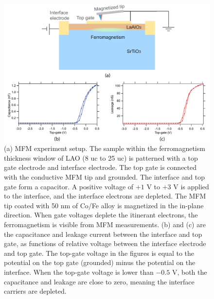 \documentclass[pdflatex, sectionletters, 12pt]{pittetd}    %
\begin{document}
\begin{figure}[p]
	\centering
	\includegraphics[width=1.0\textwidth]{Drawing/LAOSTOMFM.pdf}
	\caption{(a) MFM experiment setup. The sample within the ferromagnetism thickness window of LAO (8 uc to 25 uc) is patterned with a top gate electrode and interface electrode. The top gate is connected with the conductive MFM tip and grounded. The interface and top gate form a capacitor. A positive voltage of $+1$ V to $+3$ V is applied to the interface, and the interface electrons are depleted. The MFM tip coated with 50 nm of Co/Fe alloy is magnetized in the in-plane direction. When gate voltages deplete the itinerant electrons, the ferromagnetism is visible from MFM measurements. (b) and (c) are the capacitance and leakage current between the interface and top gate, as functions of relative voltage between the interface electrode and top gate. The top-gate voltage in the figures is equal to the potential on the top gate (grounded) minus the potential on the interface. When the top-gate voltage is lower than $-0.5$ V, both the capacitance and leakage are close to zero, meaning the interface carriers are depleted.}
	\label{FIG:LAOSTOMFM}
\end{figure}
\end{document}
